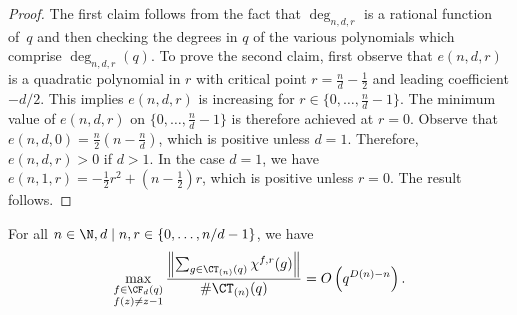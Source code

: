\begin{proof}
The first claim follows from the fact that \(\deg_{n,d,r}\) is a rational function of~\(q\) and then checking the degrees in \(q\) of the various polynomials which comprise \(\deg_{n,d,r} (q)\).
To prove the second claim, first observe that \(e(n,d,r)\) is a quadratic polynomial in \(r\) with critical point \(r = \tfrac{n}{d} - \tfrac{1}{2}\) and leading coefficient \(-d/2\).
This implies \(e(n,d,r)\) is increasing for \(r \in \{0,\ldots,\tfrac{n}{d}-1\}\).
The minimum value of \(e(n,d,r)\) on \(\{0,\ldots,\tfrac{n}{d}-1\}\) is therefore achieved at \(r = 0\).
Observe that \(e(n,d,0) = \tfrac{n}{2}\left ( n - \tfrac{n}{d}\right )\), which is positive unless \(d = 1\).
Therefore, \(e(n,d,r) > 0\) if \(d > 1\).
In the case \(d = 1\), we have \(e(n,1,r) = -\tfrac{1}{2}r^2 + (n-\tfrac{1}{2})r\), which is positive unless \(r = 0\).
The result follows.
\end{proof}







\begin{lemma}
\label{helvetica_scenario}
For all \(n \in \N, d \mid n, r \in \{0,\ldots,n/d-1\}\), we have
\begin{equation}
\max_{\substack{f \in \CF_d (q) \\ f(z) \neq z-1}}
\frac{\left \| \sum_{g \in \CT_{(n)}(q)} \chi^{f,r}(g) \right \|}{\# \CT_{(n)}(q)}
=
O \left ( q^{D(n)-n} \right ).
\end{equation}
\end{lemma}


